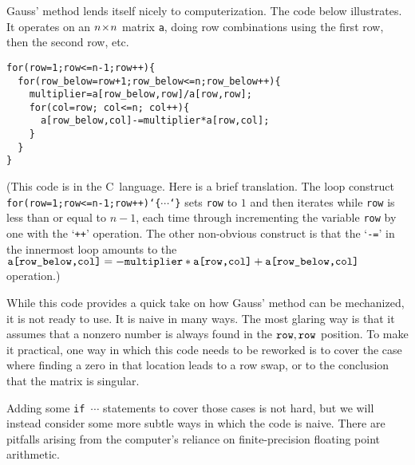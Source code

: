 Gauss' method lends itself nicely to computerization.
The code below illustrates.
It operates on an $n \! \times \! n$ matrix \texttt{a}, 
doing row combinations using the first row, then
the second row, etc.
\begin{indented}
\small
\begin{verbatim}
for(row=1;row<=n-1;row++){
  for(row_below=row+1;row_below<=n;row_below++){
    multiplier=a[row_below,row]/a[row,row];
    for(col=row; col<=n; col++){
      a[row_below,col]-=multiplier*a[row,col];
    }
  }
}
\end{verbatim}
\end{indented}
(This code is in the C~language.
Here is a brief translation.
The loop construct  
\texttt{for(row=1;row<=n-1;row++)\char`\{$\cdots$\char`\}}
sets \texttt{row} to $1$ and then iterates while
\texttt{row} is less than or equal to $n-1$, each time through
incrementing the variable \texttt{row} by one with the `\texttt{++}' operation.
The other non-obvious construct is that the `\texttt{-=}' in the innermost
loop amounts to the
$\text{\texttt{a[row\_below,col]}}=
           -\text{\texttt{multiplier}}*\text{\texttt{a[row,col]}}
           +\text{\texttt{a[row\_below,col]}}$
operation.)

While this code provides a quick take on how Gauss' method can be
mechanized, it is not ready to use.
It is naive in many ways.
The most glaring way is that it assumes that 
a nonzero number is always found in 
the $\text{\texttt{row}},\text{\texttt{row}}$ position.
To make it practical, 
one way in which this code needs to be reworked is to cover
the case where finding a zero in that location leads to a row swap, or to the
conclusion that the matrix is singular.

Adding some \texttt{if $\cdots$} statements to cover those cases is not hard,
but we will instead consider some more subtle ways in which the code is naive.
There are pitfalls arising from the computer's reliance on finite-precision
floating point arithmetic.

